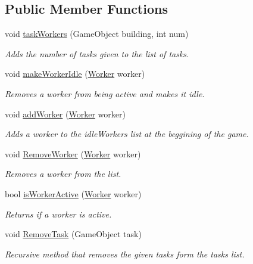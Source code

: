 \subsection*{Public Member Functions}
\begin{DoxyCompactItemize}
\item 
void \mbox{\hyperlink{class_workers_manager_ae24e5cff6ca762e22b11ae022a427047}{task\+Workers}} (Game\+Object building, int num)
\begin{DoxyCompactList}\small\item\em Adds the number of tasks given to the list of tasks. \end{DoxyCompactList}\item 
void \mbox{\hyperlink{class_workers_manager_a5e3d8d9573ed24b8ff2b8d2e1330ca63}{make\+Worker\+Idle}} (\mbox{\hyperlink{class_worker}{Worker}} worker)
\begin{DoxyCompactList}\small\item\em Removes a worker from being active and makes it idle. \end{DoxyCompactList}\item 
void \mbox{\hyperlink{class_workers_manager_afd831423d7d42862a269d6a92768e5c3}{add\+Worker}} (\mbox{\hyperlink{class_worker}{Worker}} worker)
\begin{DoxyCompactList}\small\item\em Adds a worker to the idle\+Workers list at the beggining of the game. \end{DoxyCompactList}\item 
void \mbox{\hyperlink{class_workers_manager_aad4e89044cdc4a0cf7445b2fc1b445aa}{Remove\+Worker}} (\mbox{\hyperlink{class_worker}{Worker}} worker)
\begin{DoxyCompactList}\small\item\em Removes a worker from the list. \end{DoxyCompactList}\item 
bool \mbox{\hyperlink{class_workers_manager_adadd929b4978dfbe975ccb733d031bf9}{is\+Worker\+Active}} (\mbox{\hyperlink{class_worker}{Worker}} worker)
\begin{DoxyCompactList}\small\item\em Returns if a worker is active. \end{DoxyCompactList}\item 
void \mbox{\hyperlink{class_workers_manager_aae249c0ee119a7cfc94a45cea76bfcfc}{Remove\+Task}} (Game\+Object task)
\begin{DoxyCompactList}\small\item\em Recursive method that removes the given tasks form the tasks list. \end{DoxyCompactList}\end{DoxyCompactItemize}
